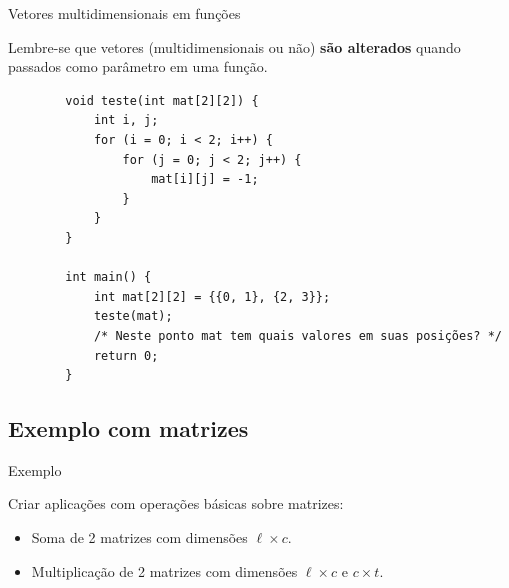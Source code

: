 \documentclass[handout]{beamer}
\begin{document}
\begin{frame}[fragile]{Vetores multidimensionais em funções}

    Lembre-se que vetores (multidimensionais ou não) \textbf{são alterados} quando passados como parâmetro em uma função.

    \begin{verbatim}
        void teste(int mat[2][2]) {
            int i, j;
            for (i = 0; i < 2; i++) {
                for (j = 0; j < 2; j++) {
                    mat[i][j] = -1;
                }
            }
        }

        int main() {
            int mat[2][2] = {{0, 1}, {2, 3}};
            teste(mat);
            /* Neste ponto mat tem quais valores em suas posições? */
            return 0;
        }
    \end{verbatim}

\end{frame}


\subsection{Exemplo com matrizes}

\begin{frame}[fragile]{Exemplo}

    Criar aplicações com operações básicas sobre matrizes:
    \begin{itemize}
        \item Soma de 2 matrizes com dimensões $\ell \times c$.
        \item Multiplicação de 2 matrizes com dimensões $\ell \times c$ e $c \times t$.
    \end{itemize}

\end{frame}
\end{document}
